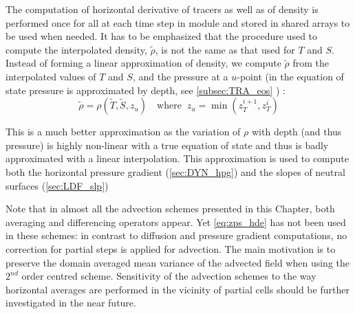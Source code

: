 \documentclass[../tex_main/NEMO_manual]{subfiles}
\begin{document}
The computation of horizontal derivative of tracers as well as of density is 
performed once for all at each time step in  module and stored 
in shared arrays to be used when needed. It has to be emphasized that the 
procedure used to compute the interpolated density, $\widetilde{\rho}$, is not 
the same as that used for $T$ and $S$. Instead of forming a linear approximation 
of density, we compute $\widetilde{\rho }$ from the interpolated values of $T$ 
and $S$, and the pressure at a $u$-point (in the equation of state pressure is 
approximated by depth, see \autoref{subsec:TRA_eos} ) : 
\begin{equation} \label{eq:zps_hde_rho}
\widetilde{\rho } = \rho ( {\widetilde{T},\widetilde {S},z_u }) 
\quad \text{where }\  z_u = \min \left( {z_T^{i+1} ,z_T^i } \right)
\end{equation} 

This is a much better approximation as the variation of $\rho$ with depth (and 
thus pressure) is highly non-linear with a true equation of state and thus is badly 
approximated with a linear interpolation. This approximation is used to compute 
both the horizontal pressure gradient (\autoref{sec:DYN_hpg}) and the slopes of neutral 
surfaces (\autoref{sec:LDF_slp})

Note that in almost all the advection schemes presented in this Chapter, both 
averaging and differencing operators appear. Yet \autoref{eq:zps_hde} has not 
been used in these schemes: in contrast to diffusion and pressure gradient 
computations, no correction for partial steps is applied for advection. The main 
motivation is to preserve the domain averaged mean variance of the advected 
field when using the $2^{nd}$ order centred scheme. Sensitivity of the advection 
schemes to the way horizontal averages are performed in the vicinity of partial 
cells should be further investigated in the near future.
\end{document}
